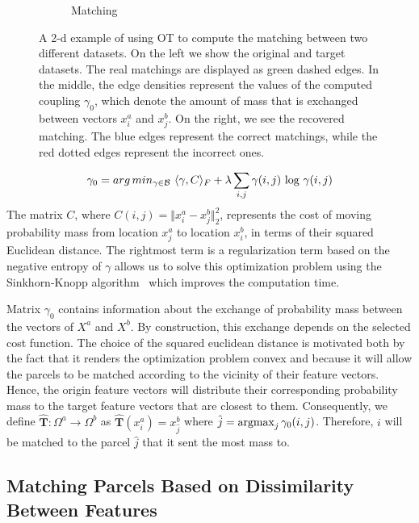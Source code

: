 \begin{figure}[t!]
\begin{subfigure}[t]{0.32\textwidth}
        \caption{{\scriptsize Matching}}
        \label{fig:otprob_c}
    \end{subfigure}
    \caption{{\footnotesize A 2-d example of using OT to compute the matching between two different datasets. On the left we show the original and target datasets. The real matchings are displayed as green dashed edges. In the middle, the edge densities represent the values of the computed coupling $\gamma_0$, which denote the amount of mass that is exchanged between vectors $x_i^a$ and $x_j^b$. On the right, we see the recovered matching. The blue edges represent the correct matchings, while the red dotted edges represent the incorrect ones.}}
    \label{fig:otprob}
\end{figure}

\begin{equation}
\gamma_0 = arg\,min_{\gamma \in \mathcal{B}} \textnormal{~} \langle \gamma,C \rangle_F + \lambda \sum_{i,j} \gamma(i,j) \textnormal{~log~} \gamma(i,j)
\end{equation}
The matrix $C$, where $C(i,j) = \Vert x^a_i - x^b_j \Vert^2_2$, represents the cost of moving probability mass from location $x^a_j$ to location $x^b_i$, in terms of their squared Euclidean distance. The rightmost term is a regularization term based on the negative entropy of $\gamma$ allows us to solve this optimization problem using the Sinkhorn-Knopp algorithm~\cite{Cuturi2013} which improves the computation time.

Matrix $\gamma_0$ contains information about the exchange of probability mass between the vectors of $X^a$ and $X^b$. By construction, this exchange depends on the selected cost function. The choice of the squared euclidean distance is motivated both by the fact that it renders the optimization problem convex and because it will allow the parcels to be matched according to the vicinity of their feature vectors. Hence, the origin feature vectors will distribute their corresponding probability mass to the target feature vectors that are closest to them. Consequently, we define $\hat{\mathbf{T}}:\Omega^a \rightarrow \Omega^b$ as $\hat{\mathbf{T}}(x^a_i) = x^b_{\hat{j}}$ where $\hat{j} = \operatorname*{argmax}_{j} \gamma_0(i,j)$. Therefore, $i$ will be matched to the parcel $\hat{j}$ that it sent the most mass to.

\subsection{Matching Parcels Based on Dissimilarity Between Features}
\label{sec:others}

